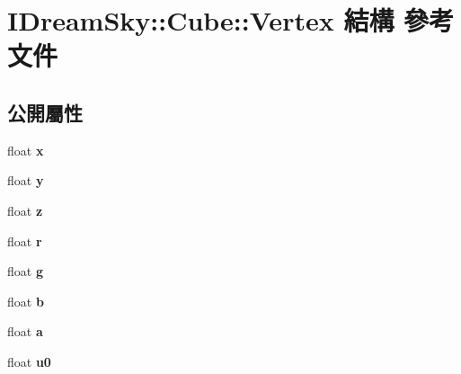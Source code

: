 \hypertarget{struct_i_dream_sky_1_1_cube_1_1_vertex}{}\section{I\+Dream\+Sky\+:\+:Cube\+:\+:Vertex 結構 參考文件}
\label{struct_i_dream_sky_1_1_cube_1_1_vertex}
\subsection*{公開屬性}
\begin{DoxyCompactItemize}
\item 
float {\bfseries x}\hypertarget{struct_i_dream_sky_1_1_cube_1_1_vertex_a1bf279b3df61d74c2407111fa04c34a0}{}\label{struct_i_dream_sky_1_1_cube_1_1_vertex_a1bf279b3df61d74c2407111fa04c34a0}

\item 
float {\bfseries y}\hypertarget{struct_i_dream_sky_1_1_cube_1_1_vertex_aef7f2aace89d3d40185a768607a0f316}{}\label{struct_i_dream_sky_1_1_cube_1_1_vertex_aef7f2aace89d3d40185a768607a0f316}

\item 
float {\bfseries z}\hypertarget{struct_i_dream_sky_1_1_cube_1_1_vertex_a5a37bd695347133378f08774ab1a0e68}{}\label{struct_i_dream_sky_1_1_cube_1_1_vertex_a5a37bd695347133378f08774ab1a0e68}

\item 
float {\bfseries r}\hypertarget{struct_i_dream_sky_1_1_cube_1_1_vertex_ab8bb507e9d30f19a41e98396bfee691d}{}\label{struct_i_dream_sky_1_1_cube_1_1_vertex_ab8bb507e9d30f19a41e98396bfee691d}

\item 
float {\bfseries g}\hypertarget{struct_i_dream_sky_1_1_cube_1_1_vertex_a35c7998c3c27a11bac08b78a1638e7b9}{}\label{struct_i_dream_sky_1_1_cube_1_1_vertex_a35c7998c3c27a11bac08b78a1638e7b9}

\item 
float {\bfseries b}\hypertarget{struct_i_dream_sky_1_1_cube_1_1_vertex_adb5344a89375ddfca0b2c79d5633aeb9}{}\label{struct_i_dream_sky_1_1_cube_1_1_vertex_adb5344a89375ddfca0b2c79d5633aeb9}

\item 
float {\bfseries a}\hypertarget{struct_i_dream_sky_1_1_cube_1_1_vertex_aca3561b9096632d4b573a8c9e1780b08}{}\label{struct_i_dream_sky_1_1_cube_1_1_vertex_aca3561b9096632d4b573a8c9e1780b08}

\item 
float {\bfseries u0}\hypertarget{struct_i_dream_sky_1_1_cube_1_1_vertex_aa32c360bd6bc063df9ca5309e0793ad0}{}\label{struct_i_dream_sky_1_1_cube_1_1_vertex_aa32c360bd6bc063df9ca5309e0793ad0}


\end{DoxyCompactItemize}
